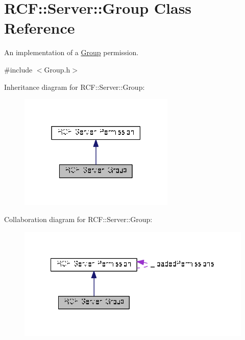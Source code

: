 \hypertarget{class_r_c_f_1_1_server_1_1_group}{}\section{R\+C\+F\+:\+:Server\+:\+:Group Class Reference}
\label{class_r_c_f_1_1_server_1_1_group}


An implementation of a \hyperlink{class_r_c_f_1_1_server_1_1_group}{Group} permission.  




{\ttfamily \#include $<$Group.\+h$>$}



Inheritance diagram for R\+C\+F\+:\+:Server\+:\+:Group\+:\nopagebreak
\begin{figure}[H]
\begin{center}
\leavevmode
\includegraphics[width=210pt]{class_r_c_f_1_1_server_1_1_group__inherit__graph}
\end{center}
\end{figure}


Collaboration diagram for R\+C\+F\+:\+:Server\+:\+:Group\+:\nopagebreak
\begin{figure}[H]
\begin{center}
\leavevmode
\includegraphics[width=327pt]{class_r_c_f_1_1_server_1_1_group__coll__graph}
\end{center}
\end{figure}
